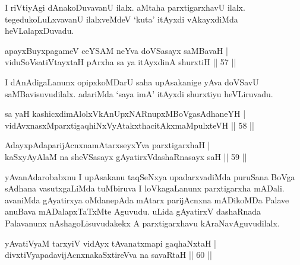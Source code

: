 \begin{artha} 
I riVtiyAgi dAnakoDuvavanU ilalx. aMtaha parxtigarxhavU ilalx. 
tegedukoLuLxvavanU ilalxveMdeV `kuta' itAyxdi vAkayxdiMda 
heVLalapxDuvadu.
\end{artha}


\begin{shl}
apayxBuyxpagameV ceYSAM neYva doVSasayx saMBavaH | \\
viduSoV\s satiVtayxtaH pArxha sa ya itAyxdinA shurxtiH \hfill ||  57 || 
\end{shl}

\begin{artha} 
I dAnAdigaLanunx opipxkoMDarU saha upAsakanige yAva doVSavU 
saMBavisuvudilalx. adariMda `saya imA' itAyxdi shurxtiyu heVLiruvadu.
\end{artha}


\begin{shl}
sa yaH kashicxdimAlolxVkAnUpxNARnupxMBoVgasAdhaneYH | \\
vidAvxnasxMparxtigaqhiNxVyAtakxthacitAkxmaMpulxteVH \hfill ||  58 || 
\end{shl}

\begin{shl}
AdayxpAdaparijAcnxnamAtarxseyxYva parxtigarxhaH  | \\
kaSxyAyAlaM na sheVSasayx gAyatirxVdashaRnasayx saH \hfill ||  59 || 
\end{shl}

\begin{artha} 
yAvanAdarobabxnu I upAsakanu taqSeNxya upadarxvadiMda puruSana BoVga 
sAdhana vasutxgaLiMda tuMbiruva I loVkagaLanunx parxtigarxha mADali. 
avaniMda gAyatirxya oMdanepAda mAtarx parijAcnxna mADikoMDa Palave 
anuBava mADalapxTaTxMte Aguvudu. uLida gAyatirxV dashaRnada Palavanunx 
nAshagoLisuvudakekx A parxtigarxhavu kAraNavAguvudilalx.
\end{artha}


\begin{shl}
yAvatiVyaM tarxyiV vidAyx tAvanatxmapi gaqhaNxtaH | \\
divxtiVyapadavijAcnxnakaSxtireVva na savaRtaH \hfill ||  60 || 
\end{shl}

